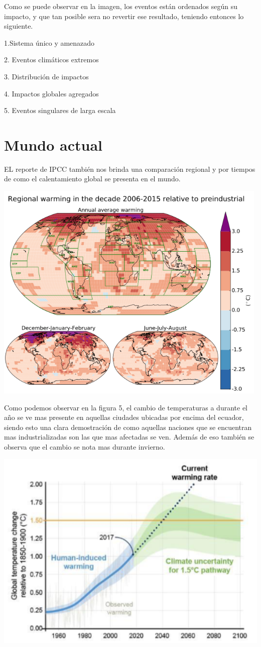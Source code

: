 \documentclass[6pt, spanish]{report}
\begin{document}
Como se puede observar en la imagen, los eventos están ordenados según su impacto, y que tan posible sera no revertir ese resultado, teniendo entonces lo siguiente.

1.Sistema único y amenazado
     
2. Eventos climáticos extremos

3. Distribución de impactos

4. Impactos globales agregados

5. Eventos singulares de larga escala



\section*{Mundo actual}
EL reporte de IPCC también nos brinda una comparación regional y por tiempos de como el calentamiento global se presenta en el mundo. 

\begin{center}\vspace{.2cm}
\includegraphics[width=.2\linewidth]{Grafica5.png}
\end{center}\vspace{.2cm}

Como podemos observar en la figura 5, el cambio de temperaturas a durante el año se ve mas presente en aquellas ciudades ubicadas por encima del ecuador, siendo esto una clara demostración de como aquellas naciones que se encuentran mas industrializadas son las que mas afectadas se ven. 
Además de eso también se observa que el cambio se nota mas durante invierno.


\begin{center}\vspace{.2cm}
\includegraphics[width=.2\linewidth]{Grafica6.png}
\end{center}\vspace{.2cm}
\end{document}
